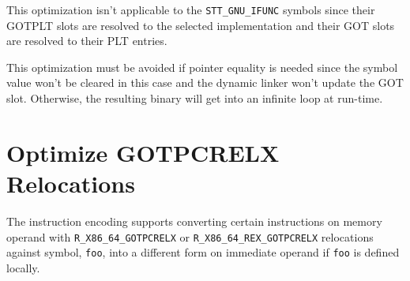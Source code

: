 This optimization isn't applicable to the \texttt{STT_GNU_IFUNC} symbols
since their GOTPLT slots are resolved to the selected implementation and
their GOT slots are resolved to their PLT entries.

This optimization must be avoided if pointer equality is needed since
the symbol value won't be cleared in this case and the dynamic linker
won't update the GOT slot.  Otherwise, the resulting binary will get
into an infinite loop at run-time.

\section{Optimize GOTPCRELX Relocations}
\label{opt_gotpcrelx}

The \xARCH instruction encoding supports converting certain instructions
on memory operand with \texttt{R_X86_64_GOTPCRELX} or
\texttt{R_X86_64_REX_GOTPCRELX} relocations against symbol, \texttt{foo},
into a different form on immediate operand if \texttt{foo} is defined
locally.

